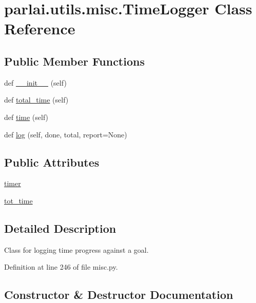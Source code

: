 \hypertarget{classparlai_1_1utils_1_1misc_1_1TimeLogger}{}\section{parlai.\+utils.\+misc.\+Time\+Logger Class Reference}
\label{classparlai_1_1utils_1_1misc_1_1TimeLogger}
\subsection*{Public Member Functions}
\begin{DoxyCompactItemize}
\item 
def \hyperlink{classparlai_1_1utils_1_1misc_1_1TimeLogger_a11aae5a0adf1f9081b5a454b79c89b89}{\+\_\+\+\_\+init\+\_\+\+\_\+} (self)
\item 
def \hyperlink{classparlai_1_1utils_1_1misc_1_1TimeLogger_a18d3faec4442ed5b313c88d566f43b2d}{total\+\_\+time} (self)
\item 
def \hyperlink{classparlai_1_1utils_1_1misc_1_1TimeLogger_aa8e859dc10c12159501bbf545ca62a51}{time} (self)
\item 
def \hyperlink{classparlai_1_1utils_1_1misc_1_1TimeLogger_a52458d882781ad6a6cbcea479ff495de}{log} (self, done, total, report=None)
\end{DoxyCompactItemize}
\subsection*{Public Attributes}
\begin{DoxyCompactItemize}
\item 
\hyperlink{classparlai_1_1utils_1_1misc_1_1TimeLogger_a7592e5ebb754f91e73b66b409fda2d77}{timer}
\item 
\hyperlink{classparlai_1_1utils_1_1misc_1_1TimeLogger_a831849f16f6779f8b77289c3caa65689}{tot\+\_\+time}
\end{DoxyCompactItemize}


\subsection{Detailed Description}
\begin{DoxyVerb}Class for logging time progress against a goal.
\end{DoxyVerb}
 

Definition at line 246 of file misc.\+py.



\subsection{Constructor \& Destructor Documentation}
\mbox{\label{classparlai_1_1utils_1_1misc_1_1TimeLogger_a11aae5a0adf1f9081b5a454b79c89b89}} 

